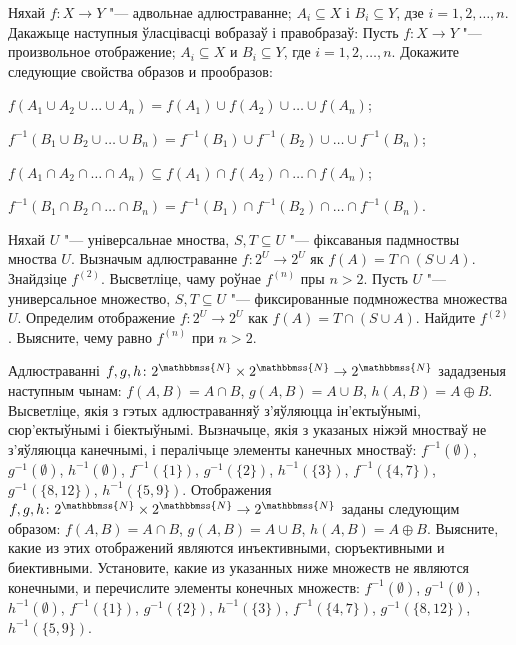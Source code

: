 \documentclass[12pt, a4paper]{article}
\begin{document}

\begin{problemList}

\problemItemWithCommonPart
{Няхай $f \colon X \to Y$ "--- адвольнае адлюстраванне;
$A_i \subseteq X$ і $B_i \subseteq Y$, дзе $i = 1, 2, \ldots, n$.
Дакажыце наступныя ўласцівасці вобразаў і правобразаў:}
{Пусть $f \colon X \to Y$ "--- произвольное отображение;
$A_i \subseteq X$ и $B_i \subseteq Y$, где $i = 1, 2, \ldots, n$.
Докажите следующие свойства образов и прообразов:}
{%
\begin{belarusianEnumerate}
    \item $f(A_1 \cup A_2 \cup \ldots \cup A_n) = f(A_1) \cup f(A_2) \cup \ldots \cup f(A_n)$;
    \item $f^{-1}(B_1 \cup B_2 \cup \ldots \cup B_n) = f^{-1}(B_1) \cup f^{-1}(B_2) \cup \ldots \cup f^{-1}(B_n)$;
    \item $f(A_1 \cap A_2 \cap \ldots \cap A_n) \subseteq f(A_1) \cap f(A_2) \cap \ldots \cap f(A_n)$;
    \item $f^{-1}(B_1 \cap B_2 \cap \ldots \cap B_n) = f^{-1}(B_1) \cap f^{-1}(B_2) \cap \ldots \cap f^{-1}(B_n)$.
\end{belarusianEnumerate}
}

\smallskip

\problemItemSimple
{Няхай $U$ "--- універсальнае мноства, $S, T \subseteq U$ "--- фіксаваныя падмноствы мноства $U$.
Вызначым адлюстраванне $f \colon 2^U \to 2^U$ як $f(A) = T \cap (S \cup A)$. Знайдзіце $f^{(2)}$.
Высветліце, чаму роўнае $f^{(n)}$ пры $n > 2$.}
{Пусть $U$ "--- универсальное множество, $S, T \subseteq U$ "--- фиксированные подмножества множества $U$.
Определим отображение $f \colon 2^U \to 2^U$ как $f(A) = T \cap (S \cup A)$. Найдите $f^{(2)}$.
Выясните, чему равно $f^{(n)}$ при $n > 2$.}

\bigskip

\problemItemSimple
{%
Адлюстраванні $f, g, h \colon 2^{\mathbbmss{N}} \times 2^{\mathbbmss{N}} \to 2^{\mathbbmss{N}}$
зададзеныя наступным чынам: $f(A, B) = A \cap B$, $g(A, B) = A \cup B$, $h(A, B) = A \oplus B$.
Высветліце, якія з гэтых адлюстраванняў з'яўляюцца ін'ектыўнымі, сюр'ектыўнымі і біектыўнымі.
Вызначыце, якія з указаных ніжэй мностваў не з'яўляюцца канечнымі, і пералічыце элементы канечных мностваў:
$f^{-1}(\emptyset)$, $g^{-1}(\emptyset)$, $h^{-1}(\emptyset)$, $f^{-1}(\{1\})$,
$g^{-1}(\{2\})$, $h^{-1}(\{3\})$, $f^{-1}(\{4, 7\})$,
$g^{-1}(\{8, 12\})$, $h^{-1}(\{5, 9\})$.
}
{%
Отображения $f, g, h \colon 2^{\mathbbmss{N}} \times 2^{\mathbbmss{N}} \to 2^{\mathbbmss{N}}$
заданы следующим образом: $f(A, B) = A \cap B$, $g(A, B) = A \cup B$, $h(A, B) = A \oplus B$.
Выясните, какие из этих отображений являются инъективными, сюръективными и биективными.
Установите, какие из указанных ниже множеств не являются конечными, и перечислите элементы конечных множеств:
$f^{-1}(\emptyset)$, $g^{-1}(\emptyset)$, $h^{-1}(\emptyset)$, $f^{-1}(\{1\})$,
$g^{-1}(\{2\})$, $h^{-1}(\{3\})$, $f^{-1}(\{4, 7\})$,
$g^{-1}(\{8, 12\})$, $h^{-1}(\{5, 9\})$.
}


\end{problemList}
\end{document}

